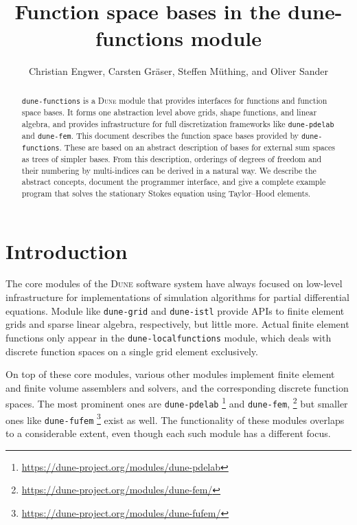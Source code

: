 \documentclass[a4paper,10pt,headings=normal,bibliography=totoc]{scrartcl}
\title{Function space bases in the dune-functions module}
\author{Christian Engwer, Carsten Gräser, Steffen Müthing, and Oliver Sander}
\newcommand{\dune}{\textsc{Dune}\xspace}
\newcommand{\dunemodule}[1]{\texttt{#1}}
\begin{document}
\maketitle

\begin{abstract}
 \dunemodule{dune-functions} is a \dune module that provides interfaces for functions and function space bases.
 It forms one abstraction level above grids, shape functions, and linear algebra, and provides infrastructure
 for full discretization frameworks like \dunemodule{dune-pdelab} and \dunemodule{dune-fem}.
 This document describes the function space bases provided by \dunemodule{dune-functions}.  These are
 based on an abstract description of bases for external sum spaces as trees of simpler bases.
 From this description, orderings of degrees of freedom and their numbering by multi-indices can be
 derived in a natural way. We describe the abstract concepts, document the programmer interface,
 and give a complete example program that solves the stationary Stokes equation using Taylor--Hood elements.
\end{abstract}

\section*{Introduction}

The core modules of the \dune software system have always focused on low-level infrastructure for
implementations of simulation algorithms for partial differential equations.  Module like
\dunemodule{dune-grid} and \dunemodule{dune-istl} provide APIs to finite  element grids
and sparse linear algebra, respectively, but little more. Actual finite element functions only
appear in the \dunemodule{dune-localfunctions} module, which deals with discrete function spaces
on a single grid element exclusively.

On top of these core modules, various other modules implement finite element and finite volume assemblers
and solvers, and the corresponding discrete function spaces. The most prominent ones are
\dunemodule{dune-pdelab}%
\footnote{\url{https://dune-project.org/modules/dune-pdelab}}
%
and \dunemodule{dune-fem},%
\footnote{\url{https://dune-project.org/modules/dune-fem/}}
%
but smaller ones like \dunemodule{dune-fufem}%
\footnote{\url{https://dune-project.org/modules/dune-fufem/}}
%
exist as well.  The functionality of these modules overlaps to a considerable extent, even though
each such module has a different focus.
\end{document}

